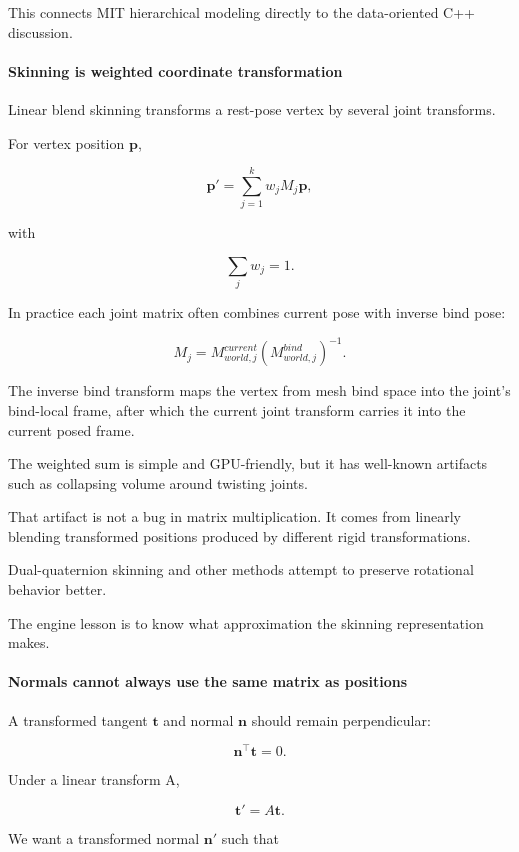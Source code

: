 This connects MIT hierarchical modeling directly to the data-oriented C++ discussion.

\paragraph{Skinning is weighted coordinate transformation}\label{skinning-is-weighted-coordinate-transformation}

Linear blend skinning transforms a rest-pose vertex by several joint transforms.

For vertex position \(\mathbf p\),

\[
\mathbf p'
=
\sum_{j=1}^{k}
w_j
M_j
\mathbf p,
\]

with

\[
\sum_j w_j=1.
\]

In practice each joint matrix often combines current pose with inverse bind pose:

\[
M_j
=
M_{world,j}^{current}
\left(M_{world,j}^{bind}\right)^{-1}.
\]

The inverse bind transform maps the vertex from mesh bind space into the joint's bind-local frame, after which the current joint transform carries it into the current posed frame.

The weighted sum is simple and GPU-friendly, but it has well-known artifacts such as collapsing volume around twisting joints.

That artifact is not a bug in matrix multiplication. It comes from linearly blending transformed positions produced by different rigid transformations.

Dual-quaternion skinning and other methods attempt to preserve rotational behavior better.

The engine lesson is to know what approximation the skinning representation makes.

\paragraph{Normals cannot always use the same matrix as positions}\label{normals-cannot-always-use-the-same-matrix-as-positions}

A transformed tangent \(\mathbf t\) and normal \(\mathbf n\) should remain perpendicular:

\[
\mathbf n^\top\mathbf t=0.
\]

Under a linear transform A,

\[
\mathbf t'=A\mathbf t.
\]

We want a transformed normal \(\mathbf n'\) such that

